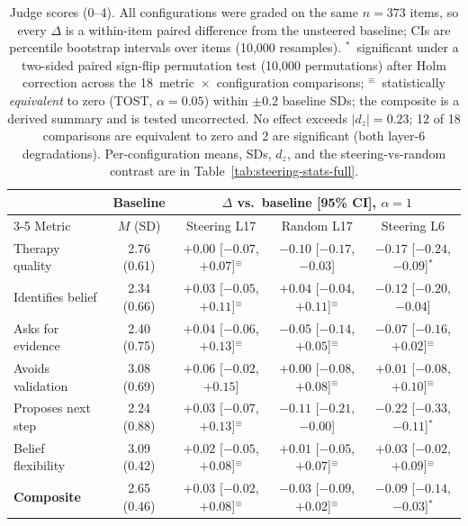 \begin{table}[t]
\centering
\footnotesize
\setlength{\tabcolsep}{5pt}
\begin{tabular}{@{}lcccc@{}}
\toprule
& Baseline & \multicolumn{3}{c}{$\Delta$ vs.\ baseline [95\% CI], $\alpha{=}1$} \\
\cmidrule(l){3-5}
Metric & $M$ (SD) & Steering L17 & Random L17 & Steering L6 \\
\midrule
Therapy quality & 2.76 (0.61) & $+0.00$ [$-0.07$, $+0.07$]$^{\equiv}$ & $-0.10$ [$-0.17$, $-0.03$] & $-0.17$ [$-0.24$, $-0.09$]$^{*}$ \\
Identifies belief & 2.34 (0.66) & $+0.03$ [$-0.05$, $+0.11$]$^{\equiv}$ & $+0.04$ [$-0.04$, $+0.11$]$^{\equiv}$ & $-0.12$ [$-0.20$, $-0.04$] \\
Asks for evidence & 2.40 (0.75) & $+0.04$ [$-0.06$, $+0.13$]$^{\equiv}$ & $-0.05$ [$-0.14$, $+0.05$]$^{\equiv}$ & $-0.07$ [$-0.16$, $+0.02$]$^{\equiv}$ \\
Avoids validation & 3.08 (0.69) & $+0.06$ [$-0.02$, $+0.15$] & $+0.00$ [$-0.08$, $+0.08$]$^{\equiv}$ & $+0.01$ [$-0.08$, $+0.10$]$^{\equiv}$ \\
Proposes next step & 2.24 (0.88) & $+0.03$ [$-0.07$, $+0.13$]$^{\equiv}$ & $-0.11$ [$-0.21$, $-0.00$] & $-0.22$ [$-0.33$, $-0.11$]$^{*}$ \\
Belief flexibility & 3.09 (0.42) & $+0.02$ [$-0.05$, $+0.08$]$^{\equiv}$ & $+0.01$ [$-0.05$, $+0.07$]$^{\equiv}$ & $+0.03$ [$-0.02$, $+0.09$]$^{\equiv}$ \\
\midrule
\textbf{Composite} & 2.65 (0.46) & $+0.03$ [$-0.02$, $+0.08$]$^{\equiv}$ & $-0.03$ [$-0.09$, $+0.02$]$^{\equiv}$ & $-0.09$ [$-0.14$, $-0.03$]$^{*}$ \\
\bottomrule
\end{tabular}
\caption{Judge scores (0--4). All configurations were graded on the same $n=373$ items, so every $\Delta$ is a within-item paired difference from the unsteered baseline; CIs are percentile bootstrap intervals over items (10,000 resamples). $^{*}$~significant under a two-sided paired sign-flip permutation test (10,000 permutations) after Holm correction across the 18~metric~$\times$~configuration comparisons; $^{\equiv}$~statistically \emph{equivalent} to zero (TOST, $\alpha=0.05$) within $\pm0.2$ baseline SDs; the composite is a derived summary and is tested uncorrected. No effect exceeds $|d_z|=0.23$; 12 of 18 comparisons are equivalent to zero and 2 are significant (both layer-6 degradations). Per-configuration means, SDs, $d_z$, and the steering-vs-random contrast are in Table~\ref{tab:steering-stats-full}.}
\label{tab:steering-stats}
\end{table}
